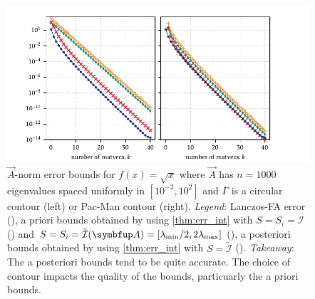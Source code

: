 \begin{figure}[htb]
    \begin{center}
        \includegraphics{imgs/ch7_sqrt_Anorm.pdf} 
    \end{center}
    \caption[{\( \vec{A} \)-norm error bounds for \( f(x) = \sqrt{x} \) where \( \vec{A} \) has \( n=1000 \) eigenvalues spaced uniformly in \( [10^{-2},10^2] \) and \( \Gamma \) is a circular contour (left) or Pac-Man contour (right).}]{%
    \( \vec{A} \)-norm error bounds for \( f(x) = \sqrt{x} \) where \( \vec{A} \) has \( n=1000 \) eigenvalues spaced uniformly in \( [10^{-2},10^2] \) and \( \Gamma \) is a circular contour (left) or Pac-Man contour (right).
    \hspace{.25em}\emph{Legend}:
    Lanczos-FA error 
    ({\protect{}}), a priori bounds obtained by using \cref{thm:err_int} with \( S = S_i = \mathcal{I}  \)
    ({\protect{}}) 
    and \( S = S_i = \tilde{\mathcal{I}}(\vec{A}) = [ \lmin/2, 2 \lmax] \)
    ({\protect{}}), 
    a posteriori bounds obtained by using \cref{thm:err_int} with \( S = \tilde{\mathcal{I}} \)
    ({\protect{}}).
    \hspace{.25em}\emph{Takeaway}: The a posteriori bounds tend to be quite accurate. The choice of contour impacts the quality of the bounds, particuarly the a priori bounds.
    }
    \label{fig:ch7_sqrt_Anorm}
\end{figure}


